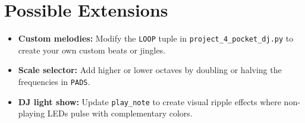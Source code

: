 \section{Possible Extensions}
\begin{itemize}
    \item \textbf{Custom melodies:} Modify the \texttt{LOOP} tuple in \texttt{project\_4\_pocket\_dj.py} to create your own custom beats or jingles.
    \item \textbf{Scale selector:} Add higher or lower octaves by doubling or halving the frequencies in \texttt{PADS}.
    \item \textbf{DJ light show:} Update \texttt{play\_note} to create visual ripple effects where non-playing LEDs pulse with complementary colors.
\end{itemize}
